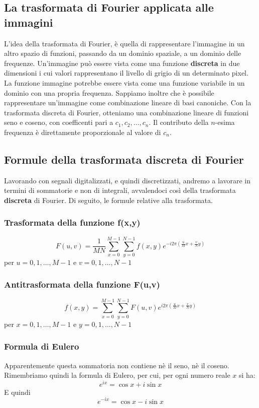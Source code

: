 \documentclass{report}
\begin{document}
	\subsection{La trasformata di Fourier applicata alle immagini}
	L'idea della trasformata di Fourier, è quella di rappresentare l'immagine in un altro spazio di funzioni, passando da un dominio spaziale, a un dominio delle frequenze.
	Un'immagine può essere vista come una funzione \textbf{discreta} in due dimensioni i cui valori rappresentano il livello di grigio di un determinato pixel. 
	La funzione immagine potrebbe essere vista come una funzione variabile in un dominio con una propria frequenza.
	Sappiamo inoltre che è possibile rappresentare un'immagine come combinazione lineare di basi canoniche. Con la trasformata discreta di Fourier, otteniamo una combinazione lineare di funzioni seno e coseno, con coefficenti pari a $c_1, c_2, \dots, c_n$. Il contributo della $n$-esima frequenza è direttamente proporzionale al valore di $c_n$.
	    
	\subsection{Formule della trasformata discreta di Fourier}
	Lavorando con segnali digitalizzati, e quindi discretizzati, andremo a lavorare in termini di sommatorie e non di integrali, avvalendoci così della trasformata \textbf{discreta} di Fourier. Di seguito, le formule relative alla trasformata.
	\subsubsection{Trasformata della funzione f(x,y)}
	$$
	F(u,v) = \frac{1}{MN}\sum_{x=0}^{M-1}\sum_{y=0}^{N-1}f(x,y)e^{-i2 \pi (\frac{u}{M}x+ \frac{v}{N}y)}
	$$
	per $u=0,1,\dots,M-1 $ e $ v=0,1,\dots,N-1$
	\subsubsection{Antitrasformata della funzione F(u,v)}
	$$
	f(x,y) = \sum_{x=0}^{M-1}\sum_{y=0}^{N-1}F(u,v)e^{i2 \pi (\frac{u}{M}x+ \frac{v}{N}y)}
	$$
	per $x=0,1,\dots,M-1 $ e $y=0,1,\dots,N-1$
	\subsubsection{Formula di Eulero}
	Apparentemente questa sommatoria non contiene nè il seno, nè il coseno. \\Rimembriamo quindi la formula di Eulero, per cui, per ogni numero reale $x$ si ha:
	$$
	e^{ix}= \cos{x}+i\sin{x}
	$$
	E quindi
	$$
	e^{-ix} = \cos{x}-i\sin{x}
	$$
\end{document}
